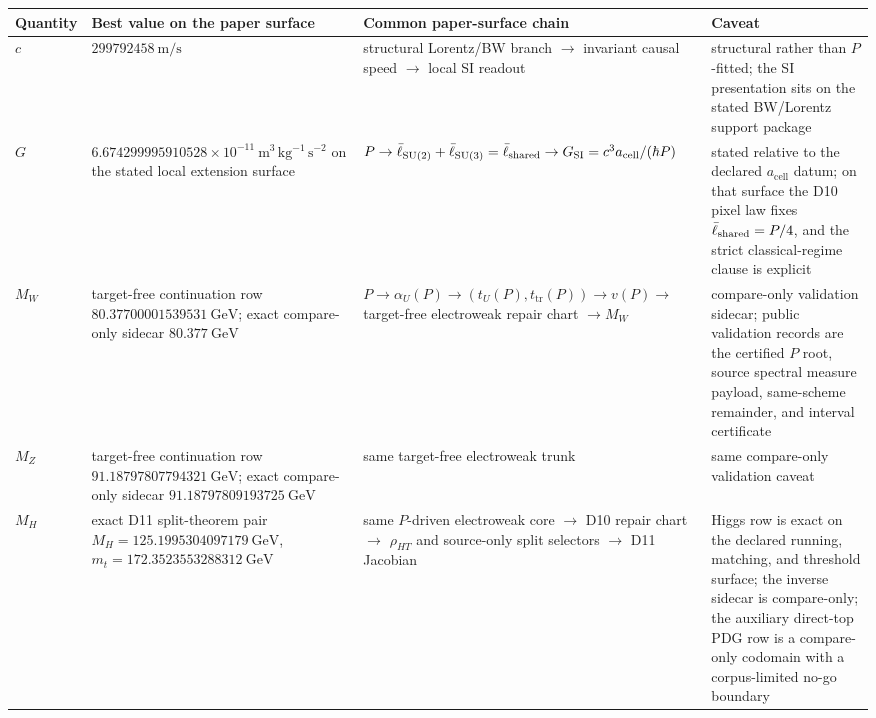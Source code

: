 {\centering
\scriptsize
\setlength{\tabcolsep}{3pt}
\begin{tabular}{@{}>{\raggedright\arraybackslash}p{}>{\raggedright\arraybackslash}p{}>{\raggedright\arraybackslash}p{}>{\raggedright\arraybackslash}p{}@{}}
\toprule
Quantity & Best value on the paper surface & Common paper-surface chain & Caveat \\
\midrule
\(c\) & \(299792458~\mathrm{m/s}\) & structural Lorentz/BW branch \(\rightarrow\) invariant causal speed \(\rightarrow\) local SI readout & structural rather than \(P\)-fitted; the SI presentation sits on the stated BW/Lorentz support package \\
\(G\) & \(6.674299995910528\times10^{-11}~\mathrm{m^3\,kg^{-1}\,s^{-2}}\) on the stated local extension surface & \(P \rightarrow \bar{\ell}_{\mathrm{SU(2)}}+\bar{\ell}_{\mathrm{SU(3)}} = \bar{\ell}_{\mathrm{shared}} \rightarrow G_{\mathrm{SI}} = c^3 a_{\mathrm{cell}}/(\hbar P)\) & stated relative to the declared \(a_{\mathrm{cell}}\) datum; on that surface the D10 pixel law fixes \(\bar{\ell}_{\mathrm{shared}}=P/4\), and the strict classical-regime clause is explicit \\
\(M_W\) & target-free continuation row \(80.37700001539531~\mathrm{GeV}\); exact compare-only sidecar \(80.377~\mathrm{GeV}\) & \(P \rightarrow \alpha_U(P) \rightarrow (t_U(P),t_{\mathrm{tr}}(P)) \rightarrow v(P) \rightarrow\) target-free electroweak repair chart \(\rightarrow M_W\) & compare-only validation sidecar; public validation records are the certified \(P\) root, source spectral measure payload, same-scheme remainder, and interval certificate \\
\(M_Z\) & target-free continuation row \(91.18797807794321~\mathrm{GeV}\); exact compare-only sidecar \(91.18797809193725~\mathrm{GeV}\) & same target-free electroweak trunk & same compare-only validation caveat \\
\(M_H\) & exact D11 split-theorem pair \(M_H=125.1995304097179~\mathrm{GeV}\), \(m_t=172.3523553288312~\mathrm{GeV}\) & same \(P\)-driven electroweak core \(\rightarrow\) D10 repair chart \(\rightarrow\) \(\rho_{HT}\) and source-only split selectors \(\rightarrow\) D11 Jacobian & Higgs row is exact on the declared running, matching, and threshold surface; the inverse sidecar is compare-only; the auxiliary direct-top PDG row is a compare-only codomain with a corpus-limited no-go boundary \\
\bottomrule
\end{tabular}
\par}

